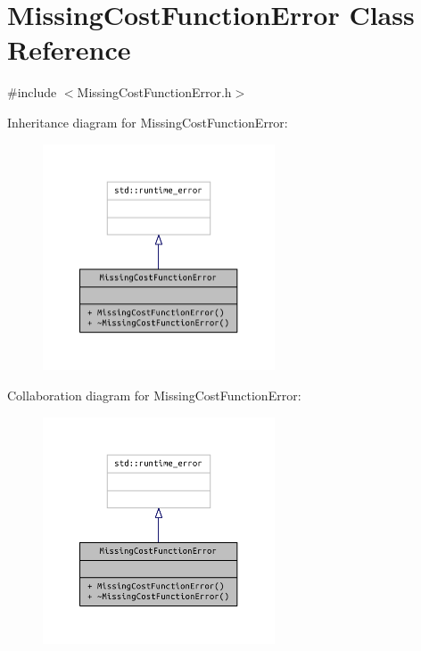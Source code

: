 \section{Missing\+Cost\+Function\+Error Class Reference}
\label{class_missing_cost_function_error}


{\ttfamily \#include $<$Missing\+Cost\+Function\+Error.\+h$>$}



Inheritance diagram for Missing\+Cost\+Function\+Error\+:\nopagebreak
\begin{figure}[H]
\begin{center}
\leavevmode
\includegraphics[width=195pt]{class_missing_cost_function_error__inherit__graph}
\end{center}
\end{figure}


Collaboration diagram for Missing\+Cost\+Function\+Error\+:\nopagebreak
\begin{figure}[H]
\begin{center}
\leavevmode
\includegraphics[width=195pt]{class_missing_cost_function_error__coll__graph}
\end{center}
\end{figure}
